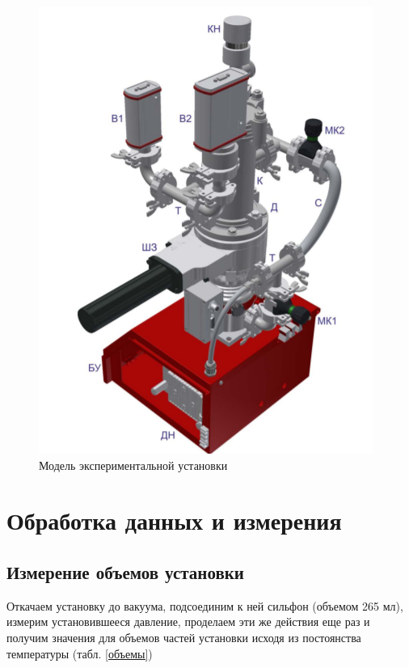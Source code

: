 \documentclass[a4paper,12pt]{article} %
\begin{document}
\begin{figure}[h!]
\begin{center}
\includegraphics[width=\textwidth]{Схема}
\end{center}
\caption{Модель экспериментальной установки} \label{схема}
\end{figure}

\section{Обработка данных и измерения}
\subsection{Измерение объемов установки}
Откачаем установку до вакуума, подсоединим к ней сильфон (объемом 265 мл), измерим установившееся давление, проделаем эти же действия еще раз и получим значения для объемов частей установки исходя из постоянства температуры (табл. \ref{объемы})
\end{document}

